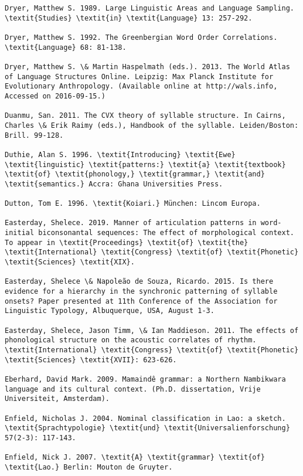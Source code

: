 \begin{verbatim}
Dryer, Matthew S. 1989. Large Linguistic Areas and Language Sampling. \textit{Studies} \textit{in} \textit{Language} 13: 257-292.

Dryer, Matthew S. 1992. The Greenbergian Word Order Correlations. \textit{Language} 68: 81-138.

Dryer, Matthew S. \& Martin Haspelmath (eds.). 2013. The World Atlas of Language Structures Online. Leipzig: Max Planck Institute for Evolutionary Anthropology. (Available online at http://wals.info, Accessed on 2016-09-15.)

Duanmu, San. 2011. The CVX theory of syllable structure. In Cairns, Charles \& Erik Raimy (eds.), Handbook of the syllable. Leiden/Boston: Brill. 99-128.

Duthie, Alan S. 1996. \textit{Introducing} \textit{Ewe} \textit{linguistic} \textit{patterns:} \textit{a} \textit{textbook} \textit{of} \textit{phonology,} \textit{grammar,} \textit{and} \textit{semantics.} Accra: Ghana Universities Press.

Dutton, Tom E. 1996. \textit{Koiari.} München: Lincom Europa.

Easterday, Shelece. 2019. Manner of articulation patterns in word-initial biconsonantal sequences: The effect of morphological context. To appear in \textit{Proceedings} \textit{of} \textit{the} \textit{International} \textit{Congress} \textit{of} \textit{Phonetic} \textit{Sciences} \textit{XIX}.

Easterday, Shelece \& Napoleão de Souza, Ricardo. 2015. Is there evidence for a hierarchy in the synchronic patterning of syllable onsets? Paper presented at 11th Conference of the Association for Linguistic Typology, Albuquerque, USA, August 1-3.

Easterday, Shelece, Jason Timm, \& Ian Maddieson. 2011. The effects of phonological structure on the acoustic correlates of rhythm. \textit{International} \textit{Congress} \textit{of} \textit{Phonetic} \textit{Sciences} \textit{XVII}: 623-626.

Eberhard, David Mark. 2009. Mamaindê grammar: a Northern Nambikwara language and its cultural context. (Ph.D. dissertation, Vrije Universiteit, Amsterdam).

Enfield, Nicholas J. 2004. Nominal classification in Lao: a sketch. \textit{Sprachtypologie} \textit{und} \textit{Universalienforschung} 57(2-3): 117-143.

Enfield, Nick J. 2007. \textit{A} \textit{grammar} \textit{of} \textit{Lao.} Berlin: Mouton de Gruyter.


\end{verbatim}
